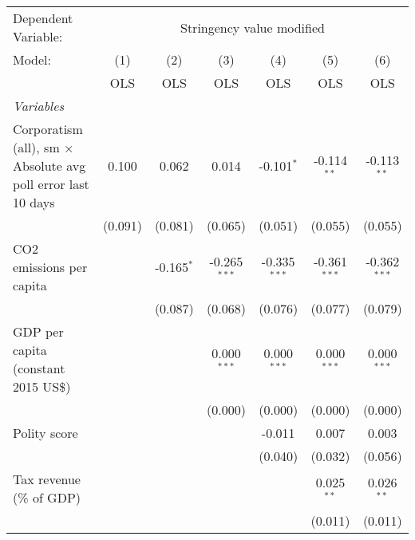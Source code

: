 
\begingroup
\centering
\begin{tabular}{lcccccc}
   \toprule
   Dependent Variable: & \multicolumn{6}{c}{Stringency value modified}\\
   Model:                                                               & (1)     & (2)          & (3)            & (4)            & (5)            & (6)\\  
                                                                        &  OLS    & OLS          & OLS            & OLS            & OLS            & OLS\\  
   \midrule
   \emph{Variables}\\
   Corporatism (all), sm $\times$ Absolute avg poll error last 10 days  & 0.100   & 0.062        & 0.014          & -0.101$^{*}$   & -0.114$^{**}$  & -0.113$^{**}$\\   
                                                                        & (0.091) & (0.081)      & (0.065)        & (0.051)        & (0.055)        & (0.055)\\   
   CO2 emissions per capita                                             &         & -0.165$^{*}$ & -0.265$^{***}$ & -0.335$^{***}$ & -0.361$^{***}$ & -0.362$^{***}$\\   
                                                                        &         & (0.087)      & (0.068)        & (0.076)        & (0.077)        & (0.079)\\   
   GDP per capita (constant 2015 US\$)                                  &         &              & 0.000$^{***}$  & 0.000$^{***}$  & 0.000$^{***}$  & 0.000$^{***}$\\   
                                                                        &         &              & (0.000)        & (0.000)        & (0.000)        & (0.000)\\   
   Polity score                                                         &         &              &                & -0.011         & 0.007          & 0.003\\   
                                                                        &         &              &                & (0.040)        & (0.032)        & (0.056)\\   
   Tax revenue (\% of GDP)                                              &         &              &                &                & 0.025$^{**}$   & 0.026$^{**}$\\   
                                                                        &         &              &                &                & (0.011)        & (0.011)\\   

\end{tabular}
